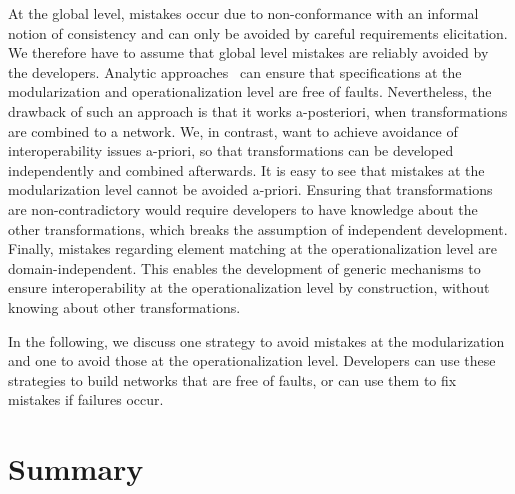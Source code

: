 At the global level, mistakes occur due to non-conformance with an informal notion of consistency and %
can only be avoided by careful requirements elicitation. 
We therefore have to assume that global level mistakes are reliably avoided by the developers.
Analytic approaches~\cite{klare2018docsym}
can ensure that specifications at the modularization and operationalization level are free of faults.
Nevertheless, %
the drawback of such an approach is that it works a-posteriori, when transformations are combined to a network. %
We, in contrast, want to achieve avoidance of interoperability issues a-priori, so that transformations can be developed independently and combined afterwards.
It is easy to see that mistakes at the modularization level cannot be avoided a-priori. 
Ensuring that transformations are non-contradictory %
would require developers to have knowledge about the other transformations, which breaks the assumption of independent development.
%
Finally, mistakes regarding element matching at the operationalization level are domain-independent. 
This enables the development of generic mechanisms to ensure interoperability at the operationalization level by construction, without knowing about other transformations.

In the following, we discuss one strategy to avoid mistakes at the modularization and one to avoid those at the operationalization level.
Developers can use these strategies to build networks that are free of faults, or can use them to fix mistakes if failures occur.






\section{Summary}

